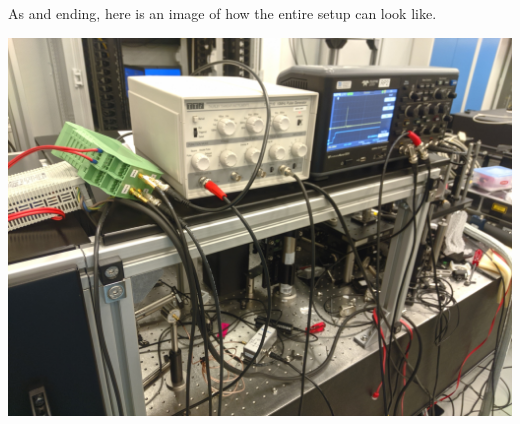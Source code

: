 \documentclass[a4paper, 10pt]{article}
\begin{document}
\begin{center}
As and ending, here is an image of how the entire setup can look like.

\vspace{5em}

\includegraphics[width=\textwidth]{../images/whole-setup.jpg}
\end{center}
\end{document}

